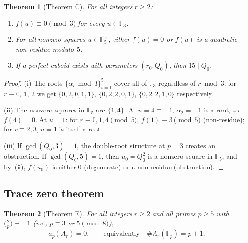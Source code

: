 \documentclass[11pt]{amsart}
\theoremstyle{plain}
\newtheorem{theorem}{Theorem}[section]
\theoremstyle{definition}
\theoremstyle{remark}
\newcommand{\FF}{\mathbb{F}}
\begin{document}
\begin{theorem}[Theorem C]\label{thm:C}
For all integers $r\ge 2$:
\begin{enumerate}[label=\textup{(\roman*)}]
\item $f(u)\equiv 0\pmod{3}$ for every $u\in\FF_3$.
\item For all nonzero squares $u\in\FF_5^\times$, either $f(u)=0$ or $f(u)$
  is a quadratic non-residue modulo~$5$.
\item If a perfect cuboid exists with parameters $(r_0,Q_0)$, then $15\mid Q_0$.
\end{enumerate}
\end{theorem}

\begin{proof}
(i) The roots $\{\alpha_i\bmod 3\}_{i=1}^{5}$ cover all of $\FF_3$ regardless of
$r\bmod 3$: for $r\equiv 0$, $1$, $2$ we get $\{0,2,0,1,1\}$, $\{0,2,2,0,1\}$,
$\{0,2,2,1,0\}$ respectively.

(ii) The nonzero squares in $\FF_5$ are $\{1,4\}$.  At $u=4\equiv-1$,
$\alpha_2=-1$ is a root, so $f(4)=0$.  At $u=1$: for $r\equiv 0,1,4\pmod{5}$,
$f(1)\equiv 3\pmod{5}$ (non-residue); for $r\equiv 2,3$, $u=1$ is itself a root.

(iii) If $\gcd(Q_0,3)=1$, the double-root structure at $p=3$ creates an
obstruction.  If $\gcd(Q_0,5)=1$, then $u_0=Q_0^2$ is a nonzero square in $\FF_5$,
and by~(ii), $f(u_0)$ is either $0$ (degenerate) or a non-residue (obstruction).
\end{proof}

\subsection{Trace zero theorem}\label{ssec:trace}

\begin{theorem}[Theorem E]\label{thm:E}
For all integers $r\ge 2$ and all primes $p\ge 5$ with $\bigl(\frac{2}{p}\bigr)=-1$
(i.e., $p\equiv 3$ or $5\pmod{8}$),
\[
  a_p(A_r) = 0,\qquad\text{equivalently}\quad \#A_r(\FF_p)=p+1.
\]
\end{theorem}
\end{document}
